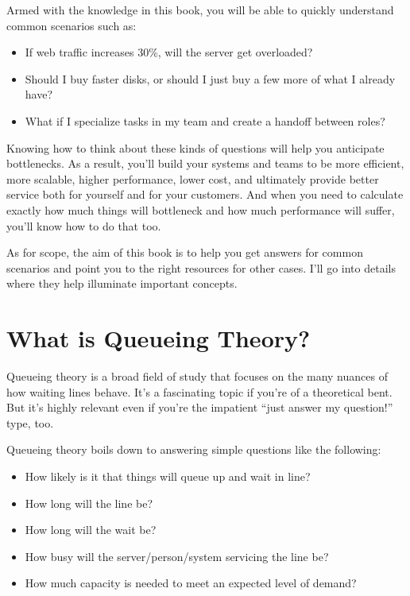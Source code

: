 \documentclass{vivid_layout}
\begin{document}
Armed with the knowledge in this book, you will be able to quickly understand common scenarios such as:

\begin{itemize}
\item If web traffic increases 30\%, will the server get overloaded?
\item Should I buy faster disks, or should I just buy a few more of what I already have?
\item What if I specialize tasks in my team and create a handoff between roles?
\end{itemize}

Knowing how to think about these kinds of questions will help you anticipate bottlenecks. As a result, you'll build your systems and teams to be more efficient, more scalable, higher performance, lower cost, and ultimately provide better service both for yourself and for your customers. And when you need to calculate exactly how much things will bottleneck and how much performance will suffer, you'll know how to do that too.

As for scope, the aim of this book is to help you get answers for common scenarios and point you to the right resources for other cases. I'll go into details where they help illuminate important concepts.

\section{What is Queueing Theory?}

Queueing theory is a broad field of study that focuses on the many nuances of how waiting lines behave. It's a fascinating topic if you're of a theoretical bent. But it's highly relevant even if you're the impatient ``just answer my question!'' type, too.

Queueing theory boils down to answering simple questions like the following:

\begin{itemize}
\item How likely is it that things will queue up and wait in line?
\item How long will the line be?
\item How long will the wait be?
\item How busy will the server/person/system servicing the line be?
\item How much capacity is needed to meet an expected level of demand?
\end{itemize}
\end{document}
